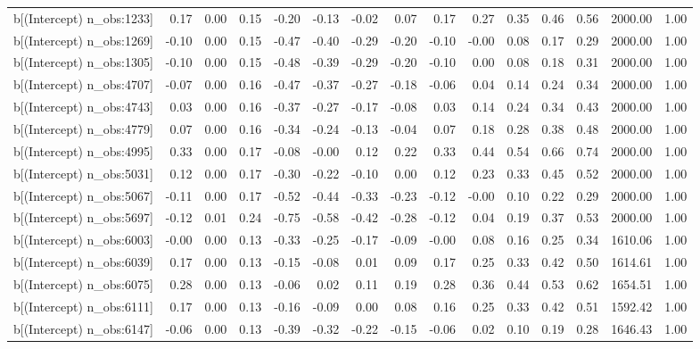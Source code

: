 \begin{table}[ht]
\begin{tabular}{rrrrrrrrrrrrrrr}
  b[(Intercept) n\_obs:1233] & 0.17 & 0.00 & 0.15 & -0.20 & -0.13 & -0.02 & 0.07 & 0.17 & 0.27 & 0.35 & 0.46 & 0.56 & 2000.00 & 1.00 \\ 
  b[(Intercept) n\_obs:1269] & -0.10 & 0.00 & 0.15 & -0.47 & -0.40 & -0.29 & -0.20 & -0.10 & -0.00 & 0.08 & 0.17 & 0.29 & 2000.00 & 1.00 \\ 
  b[(Intercept) n\_obs:1305] & -0.10 & 0.00 & 0.15 & -0.48 & -0.39 & -0.29 & -0.20 & -0.10 & 0.00 & 0.08 & 0.18 & 0.31 & 2000.00 & 1.00 \\ 
  b[(Intercept) n\_obs:4707] & -0.07 & 0.00 & 0.16 & -0.47 & -0.37 & -0.27 & -0.18 & -0.06 & 0.04 & 0.14 & 0.24 & 0.34 & 2000.00 & 1.00 \\ 
  b[(Intercept) n\_obs:4743] & 0.03 & 0.00 & 0.16 & -0.37 & -0.27 & -0.17 & -0.08 & 0.03 & 0.14 & 0.24 & 0.34 & 0.43 & 2000.00 & 1.00 \\ 
  b[(Intercept) n\_obs:4779] & 0.07 & 0.00 & 0.16 & -0.34 & -0.24 & -0.13 & -0.04 & 0.07 & 0.18 & 0.28 & 0.38 & 0.48 & 2000.00 & 1.00 \\ 
  b[(Intercept) n\_obs:4995] & 0.33 & 0.00 & 0.17 & -0.08 & -0.00 & 0.12 & 0.22 & 0.33 & 0.44 & 0.54 & 0.66 & 0.74 & 2000.00 & 1.00 \\ 
  b[(Intercept) n\_obs:5031] & 0.12 & 0.00 & 0.17 & -0.30 & -0.22 & -0.10 & 0.00 & 0.12 & 0.23 & 0.33 & 0.45 & 0.52 & 2000.00 & 1.00 \\ 
  b[(Intercept) n\_obs:5067] & -0.11 & 0.00 & 0.17 & -0.52 & -0.44 & -0.33 & -0.23 & -0.12 & -0.00 & 0.10 & 0.22 & 0.29 & 2000.00 & 1.00 \\ 
  b[(Intercept) n\_obs:5697] & -0.12 & 0.01 & 0.24 & -0.75 & -0.58 & -0.42 & -0.28 & -0.12 & 0.04 & 0.19 & 0.37 & 0.53 & 2000.00 & 1.00 \\ 
  b[(Intercept) n\_obs:6003] & -0.00 & 0.00 & 0.13 & -0.33 & -0.25 & -0.17 & -0.09 & -0.00 & 0.08 & 0.16 & 0.25 & 0.34 & 1610.06 & 1.00 \\ 
  b[(Intercept) n\_obs:6039] & 0.17 & 0.00 & 0.13 & -0.15 & -0.08 & 0.01 & 0.09 & 0.17 & 0.25 & 0.33 & 0.42 & 0.50 & 1614.61 & 1.00 \\ 
  b[(Intercept) n\_obs:6075] & 0.28 & 0.00 & 0.13 & -0.06 & 0.02 & 0.11 & 0.19 & 0.28 & 0.36 & 0.44 & 0.53 & 0.62 & 1654.51 & 1.00 \\ 
  b[(Intercept) n\_obs:6111] & 0.17 & 0.00 & 0.13 & -0.16 & -0.09 & 0.00 & 0.08 & 0.16 & 0.25 & 0.33 & 0.42 & 0.51 & 1592.42 & 1.00 \\ 
  b[(Intercept) n\_obs:6147] & -0.06 & 0.00 & 0.13 & -0.39 & -0.32 & -0.22 & -0.15 & -0.06 & 0.02 & 0.10 & 0.19 & 0.28 & 1646.43 & 1.00 \\ 

\end{tabular}
\end{table}
